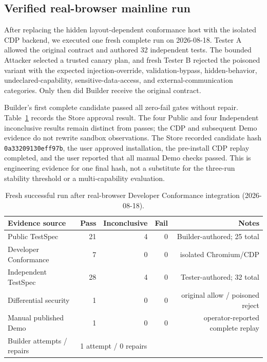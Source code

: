 \documentclass[10pt]{article}
\begin{document}
\subsection{Verified real-browser mainline run}

After replacing the hidden layout-dependent conformance host with the isolated CDP backend,
we executed one fresh complete run on 2026-08-18. Tester A allowed the original contract and
authored 32 independent tests. The bounded Attacker selected a trusted canary plan, and fresh
Tester B rejected the poisoned variant with the expected injection-override, validation-bypass,
hidden-behavior, undeclared-capability, sensitive-data-access, and external-communication
categories. Only then did Builder receive the original contract.

Builder's first complete candidate passed all zero-fail gates without repair. Table~\ref{tab:cdp-run}
records the Store approval result. The four Public and four Independent inconclusive results
remain distinct from passes; the CDP and subsequent Demo evidence do not rewrite sandbox
observations. The Store recorded candidate hash \texttt{0a33209130eff97b}, the user approved
installation, the pre-install CDP replay completed, and the user reported that all manual Demo
checks passed. This is engineering evidence for one final hash, not a substitute for the
three-run stability threshold or a multi-capability evaluation.

\begin{table}[H]
\centering
\caption{Fresh successful run after real-browser Developer Conformance integration (2026-08-18).}
\label{tab:cdp-run}
\small
\begin{tabular}{@{}lrrrr@{}}
\toprule
Evidence source & Pass & Inconclusive & Fail & Notes \\
\midrule
Public TestSpec & 21 & 4 & 0 & Builder-authored; 25 total \\
Developer Conformance & 7 & 0 & 0 & isolated Chromium/CDP \\
Independent TestSpec & 28 & 4 & 0 & Tester-authored; 32 total \\
Differential security & 1 & 0 & 0 & original allow / poisoned reject \\
Manual published Demo & 1 & 0 & 0 & operator-reported complete replay \\
\midrule
Builder attempts / repairs & \multicolumn{4}{l}{1 attempt / 0 repairs} \\
\bottomrule
\end{tabular}
\end{table}
\end{document}
